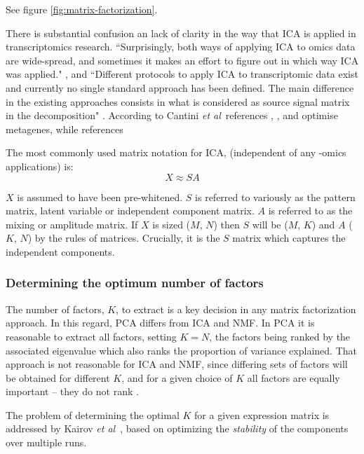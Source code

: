 \documentclass[tikz, 12pt,a4paper,oneside,fleqn]{article}
\newcommand{\etal}{{\em et al\/}}
\begin{document}
See figure \ref{fig:matrix-factorization}.

There is substantial confusion an lack of clarity in the way that ICA is applied in transcriptomics research.  ``Surprisingly, both ways of applying ICA to omics data are wide-spread, and sometimes it makes an effort to figure out in which way ICA was applied." \cite{Sompairac2019a}, and ``Different protocols to apply ICA to transcriptomic data exist and currently no single standard approach has been defined. The main difference in the existing approaches consists in what is considered as source signal matrix in the decomposition" \cite{Cantini}.   According to Cantini \etal\, references \cite{Au-Yeung2014}, \cite{Kairov2017}, \cite{Kong2008} and \cite{Lee2003} optimise metagenes, while references \cite{Meng2016} 

The most commonly used matrix notation for ICA, (independent of any -omics applications) is:
\begin{equation}
X \approx S A
\end{equation}

$X$ is assumed to have been pre-whitened.  $S$ is referred to variously as the pattern matrix, latent variable or independent component matrix.  $A$ is referred to as the mixing or amplitude matrix.   If $X$ is sized ($M$, $N$) then $S$ will be ($M$, $K$) and $A$ ($K$, $N$) by the rules of matrices.  Crucially, it is the $S$ matrix which captures the independent components.


\subsubsection{Determining the optimum number of factors}

The number of factors, $K$, to extract is a key decision in any matrix factorization approach.  In this regard, PCA differs from ICA and NMF.  In PCA it is reasonable to extract all factors, setting $K=N$, the factors being ranked by the associated eigenvalue which also ranks the proportion of variance explained.   That approach is not reasonable for ICA and NMF, since differing sets of factors will be obtained for different $K$, and for a given choice of $K$ all factors are equally important -- they do not rank \cite{Stein-OBrien2018}.

The problem of determining the optimal $K$ for a given expression matrix is addressed  by Kairov \etal\ \cite{Kairov2017}, based on optimizing the \emph{stability} of the components over multiple runs.
\end{document}
